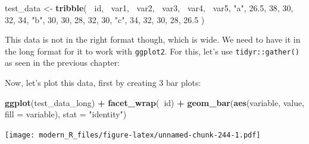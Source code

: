 \documentclass[]{gitbook}
\newenvironment{Shaded}{\begin{snugshade}}{\end{snugshade}}
\newcommand{\DataTypeTok}[1]{\textcolor[rgb]{0.13,0.29,0.53}{#1}}
\newcommand{\DecValTok}[1]{\textcolor[rgb]{0.00,0.00,0.81}{#1}}
\newcommand{\FloatTok}[1]{\textcolor[rgb]{0.00,0.00,0.81}{#1}}
\newcommand{\KeywordTok}[1]{\textcolor[rgb]{0.13,0.29,0.53}{\textbf{#1}}}
\newcommand{\NormalTok}[1]{#1}
\newcommand{\OperatorTok}[1]{\textcolor[rgb]{0.81,0.36,0.00}{\textbf{#1}}}
\newcommand{\StringTok}[1]{\textcolor[rgb]{0.31,0.60,0.02}{#1}}
\theoremstyle{definition}
\theoremstyle{definition}
\theoremstyle{definition}
\theoremstyle{remark}
\begin{document}
\begin{Shaded}
\begin{Highlighting}[]
\NormalTok{test_data <-}\StringTok{ }\KeywordTok{tribble}\NormalTok{(}
  \OperatorTok{~}\NormalTok{id, }\OperatorTok{~}\NormalTok{var1, }\OperatorTok{~}\NormalTok{var2,  }\OperatorTok{~}\NormalTok{var3, }\OperatorTok{~}\NormalTok{var4, }\OperatorTok{~}\NormalTok{var5,}
  \StringTok{"a"}\NormalTok{, }\FloatTok{26.5}\NormalTok{, }\DecValTok{38}\NormalTok{, }\DecValTok{30}\NormalTok{, }\DecValTok{32}\NormalTok{, }\DecValTok{34}\NormalTok{,}
  \StringTok{"b"}\NormalTok{, }\DecValTok{30}\NormalTok{, }\DecValTok{30}\NormalTok{, }\DecValTok{28}\NormalTok{, }\DecValTok{32}\NormalTok{, }\DecValTok{30}\NormalTok{,}
  \StringTok{"c"}\NormalTok{, }\DecValTok{34}\NormalTok{, }\DecValTok{32}\NormalTok{, }\DecValTok{30}\NormalTok{, }\DecValTok{28}\NormalTok{, }\FloatTok{26.5}
\NormalTok{)}
\end{Highlighting}
\end{Shaded}

This data is not in the right format though, which is wide. We need to
have it in the long format for it to work with \texttt{ggplot2}. For
this, let's use \texttt{tidyr::gather()} as seen in the previous
chapter:

\begin{Shaded}
\end{Shaded}

Now, let's plot this data, first by creating 3 bar plots:

\begin{Shaded}
\begin{Highlighting}[]
\KeywordTok{ggplot}\NormalTok{(test_data_long) }\OperatorTok{+}
\StringTok{  }\KeywordTok{facet_wrap}\NormalTok{(}\OperatorTok{~}\NormalTok{id) }\OperatorTok{+}
\StringTok{  }\KeywordTok{geom_bar}\NormalTok{(}\KeywordTok{aes}\NormalTok{(variable, value, }\DataTypeTok{fill =}\NormalTok{ variable), }\DataTypeTok{stat =} \StringTok{"identity"}\NormalTok{)}
\end{Highlighting}
\end{Shaded}

\texttt{[image: modern\_R\_files/figure-latex/unnamed-chunk-244-1.pdf]}
\end{document}
